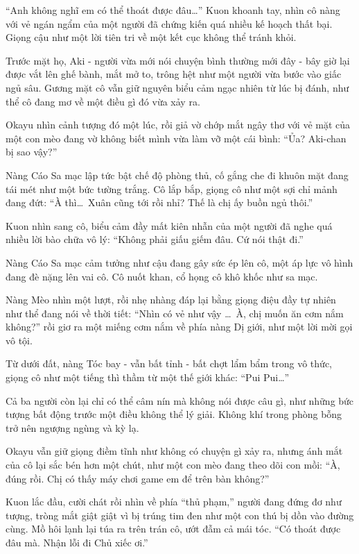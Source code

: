\documentclass[../main.tex]{subfiles}
\begin{document}
``Anh không nghĩ em có thể thoát được đâu\dots'' Kuon khoanh tay, nhìn cô nàng với vẻ ngán ngẩm của một người đã chứng kiến quá nhiều kế hoạch thất bại. Giọng cậu như một lời tiên tri về một kết cục không thể tránh khỏi.

Trước mặt họ, Aki - người vừa mới nói chuyện bình thường mới đây - bây giờ lại được vắt lên ghế bành, mắt mở to, trông hệt như một người vừa bước vào giấc ngủ sâu. Gương mặt cô vẫn giữ nguyên biểu cảm ngạc nhiên từ lúc bị đánh, như thể cô đang mơ về một điều gì đó vừa xảy ra.

Okayu nhìn cảnh tượng đó một lúc, rồi giả vờ chớp mắt ngây thơ với vẻ mặt của một con mèo đang vờ không biết mình vừa làm vỡ một cái bình: ``Ủa? Aki-chan bị sao vậy?''

Nàng Cáo Sa mạc lập tức bật chế độ phòng thủ, cố gắng che đi khuôn mặt đang tái mét như một bức tường trắng. Cô lắp bắp, giọng cô như một sợi chỉ mảnh đang đứt: ``À thì\dots\ Xuân cũng tới rồi nhỉ? Thế là chị ấy buồn ngủ thôi.''

Kuon nhìn sang cô, biểu cảm đầy mất kiên nhẫn của một người đã nghe quá nhiều lời bào chữa vô lý: ``Không phải giấu giếm đâu. Cứ nói thật đi.''

Nàng Cáo Sa mạc cảm tưởng như cậu đang gây sức ép lên cô, một áp lực vô hình đang đè nặng lên vai cô. Cô nuốt khan, cổ họng cô khô khốc như sa mạc.

Nàng Mèo nhìn một lượt, rồi nhẹ nhàng đáp lại bằng giọng điệu đầy tự nhiên như thể đang nói về thời tiết: ``Nhìn có vẻ như vậy \dots\ À, chị muốn ăn cơm nắm không?'' rồi giơ ra một miếng cơm nắm về phía nàng Dị giới, như một lời mời gọi vô tội.

Từ dưới đất, nàng Tóc bay - vẫn bất tỉnh - bất chợt lẩm bẩm trong vô thức, giọng cô như một tiếng thì thầm từ một thế giới khác: ``Pui Pui\dots''


Cả ba người còn lại chỉ có thể câm nín mà không nói được câu gì, như những bức tượng bất động trước một điều không thể lý giải. Không khí trong phòng bỗng trở nên ngượng ngùng và kỳ lạ.

Okayu vẫn giữ giọng điềm tĩnh như không có chuyện gì xảy ra, nhưng ánh mắt của cô lại sắc bén hơn một chút, như một con mèo đang theo dõi con mồi: ``À, đúng rồi. Chị có thấy máy chơi game em để trên bàn không?''

Kuon lắc đầu, cười chát rồi nhìn về phía ``thủ phạm,'' người đang đứng đơ như tượng, tròng mắt giật giật vì bị trúng tim đen như một con thú bị dồn vào đường cùng. Mồ hôi lạnh lại túa ra trên trán cô, ướt đẫm cả mái tóc. ``Có thoát được đâu mà. Nhận lỗi đi Chủ xiếc ơi.''
\end{document}
